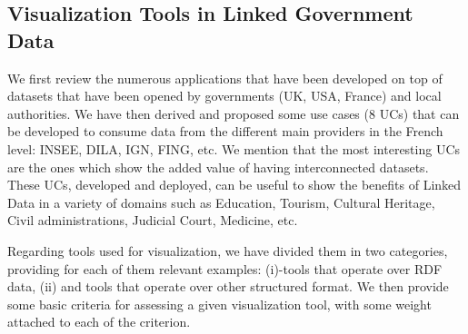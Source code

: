  

\subsection{Visualization Tools in Linked Government Data} \label{visu}

We first review the numerous applications that have been developed on top of datasets that have been opened by governments (UK, USA, France) and local authorities. We have then derived and proposed some use cases (8 UCs) that can be developed to consume data from the different main providers in the French level: INSEE, DILA, IGN, FING, etc. We mention that the most interesting UCs are the ones which show the added value of having interconnected datasets. These UCs,  developed and deployed, can be useful to show the benefits of Linked Data in a variety of domains such as Education, Tourism, Cultural Heritage, Civil administrations, Judicial Court, Medicine, etc. 

Regarding tools used for visualization, we have divided them in two categories, providing for each of them relevant examples: (i)-tools that operate over RDF data, (ii) and tools that operate over other structured format. We then provide some basic criteria for assessing a given visualization tool, with some weight attached to each of the criterion. 


